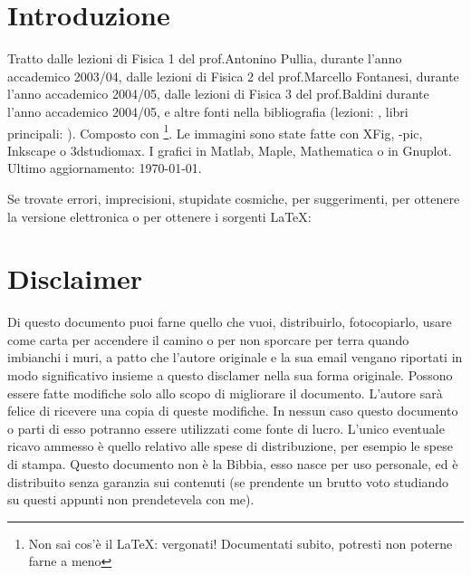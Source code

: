 \sffamily\itshape
\section*{\centering Introduzione}

Tratto dalle lezioni di Fisica 1 del %
prof.\@ Antonino Pullia, durante l'anno accademico 2003/04, dalle lezioni di Fisica 2 del prof.\@ Marcello Fontanesi, durante l'anno accademico 2004/05, dalle lezioni di Fisica 3 del prof.\@ Baldini durante l'anno accademico 2004/05, e altre fonti nella bibliografia (lezioni: \cite{Pullia, Fontanesi, Baldini, Paganoni, Lucchini, Franzoni, Monica, Barney, Maddalena}, libri principali: \cite{Fisica1, Feynm, modern, elettro, ottica, enge, alonso}). Composto con \LaTeXe\footnote{Non sai cos'è il \LaTeX: vergonati! Documentati subito, potresti non poterne farne a meno}. Le immagini sono state fatte con XFig, \Xy-pic, Inkscape o 3dstudiomax. I grafici in Matlab, Maple, Mathematica o in Gnuplot.
\newline\newline
Ultimo aggiornamento: \today.
\newline\newline
\parbox[c]{\textwidth}{
Se trovate errori, imprecisioni, stupidate cosmiche, per sug\-ge\-ri\-men\-ti, per ottenere la versione elettronica o per ottenere i sorgenti \LaTeX:
\begin{center}
\end{center}
}

\section*{\centering Disclaimer}
Di questo documento puoi farne quello che vuoi, distribuirlo, fotocopiarlo, usare come carta per accendere il camino o per non sporcare per terra quando imbianchi i muri, a patto che l'autore originale e la sua email vengano riportati in modo significativo insieme a questo disclamer nella sua forma originale. Possono essere fatte modifiche solo allo scopo di migliorare il do\-cu\-men\-to. L'autore sarà felice di ricevere una copia di queste modifiche. In nessun caso questo documento o parti di esso potranno essere utilizzati come  fonte di lucro. L'unico eventuale ricavo ammesso è quello relativo alle spese di distribuzione, per esempio le spese di stampa. Questo documento non è la Bibbia, esso nasce per uso personale, ed è distribuito senza garanzia sui contenuti (se prendente un brutto voto studiando su questi appunti non prendetevela con me).
